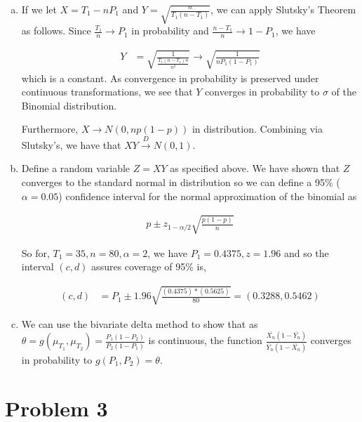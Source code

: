 \documentclass[11pt]{article}
\begin{document}
\begin{enumerate}[(a)]
  \item If we let $X = T_1 - n P_1$ and $Y =
    \sqrt{\frac{n}{T_1(n-T_1)}}$, we can apply Slutsky's Theorem as
    follows.  Since $\frac{T_1}{n} \rightarrow P_1$ in probability and
    $\frac{n-T_1}{n} \rightarrow 1-P_1$, we have

    \begin{align*}
      Y &= \sqrt{\frac{1}{\frac{T_1(n-T_1)n}{n^2}}} \rightarrow
          \sqrt{\frac{1}{nP_1(1-P_1)}}
    \end{align*}
    which is a constant.  As convergence in probability is preserved
    under continuous transformations, we see that $Y$ converges in
    probability to $\sigma$ of the Binomial distribution.

    Furthermore, $X \rightarrow N(0, np(1-p))$ in distribution.
    Combining via Slutsky's, we have that $XY \xrightarrow{D} N(0,1)$.

  \item Define a random variable $Z = XY$ as specified above.  We have
    shown that $Z$ converges to the standard normal in distribution so
    we can define a 95\% ($\alpha = 0.05$) confidence interval for the
    normal approximation of the binomial as

    \begin{align*}
      p \pm z_{1-\alpha/2} \sqrt{\frac{p(1-p)}{n}}
    \end{align*}

    So for, $T_1 = 35, n = 80, \alpha = 2$, we have $P_1 = 0.4375, z =
    1.96$ and so the interval $(c,d)$ assures coverage of 95\% is,

    \begin{align*}
      (c,d) &= P_1 \pm 1.96 \sqrt{\frac{(0.4375)*(0.5625)}{80}} =
              (0.3288, 0.5462)
    \end{align*}

  \item We can use the bivariate delta method to show that as $\theta
    = g(\mu_{T_1}, \mu_{T_2}) = \frac{P_1(1-P_2)}{P_2(1-P_1)}$ is
    continuous, the function
    $\frac{\bar{X_n}(1-\bar{Y_n})}{\bar{Y_n}(1-\bar{X_n})}$
    converges in probability to $g(P_1,P_2) = \theta$.
\end{enumerate}

\section*{Problem 3}
\end{document}
